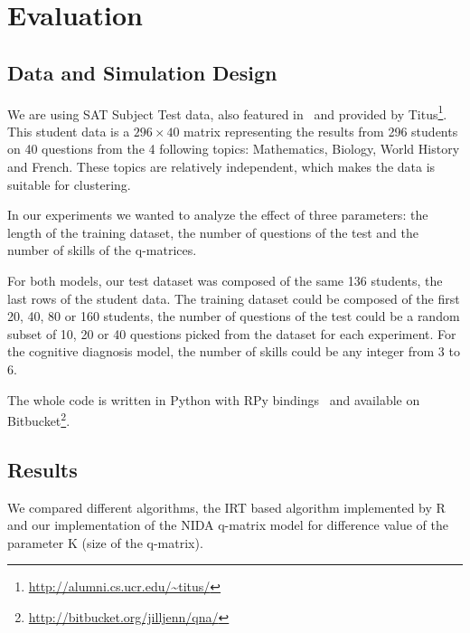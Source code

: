 \documentclass{sig-alternate}
\begin{document}
\section{Evaluation}

\subsection{Data and Simulation Design}

We are using SAT Subject Test data, also featured in~\citep{Winters2005, Desmarais2011} and provided by Titus\footnote{\url{http://alumni.cs.ucr.edu/~titus/}}. This student data is a $296 \times 40$ matrix representing the results from 296 students on 40 questions from the 4 following topics: Mathematics, Biology, World History and French. These topics are relatively independent, which makes the data is suitable for clustering. %

In our experiments we wanted to analyze the effect of three parameters: the length of the training dataset, the number of questions of the test and the number of skills of the q-matrices.

For both models, our test dataset was composed of the same 136 students, the last rows of the student data. The training dataset could be composed of the first 20, 40, 80 or 160 students, the number of questions of the test could be a random subset of 10, 20 or 40 questions picked from the dataset for each experiment. For the cognitive diagnosis model, the number of skills could be any integer from 3 to 6.

The whole code is written in Python with RPy bindings~\citep{Gautier2008} and available on Bitbucket\footnote{\url{http://bitbucket.org/jilljenn/qna/}}.

\subsection{Results}


We compared different algorithms, the IRT based algorithm implemented by R and our implementation of the NIDA q-matrix model for difference value of the parameter K (size of the q-matrix). 
\end{document}
